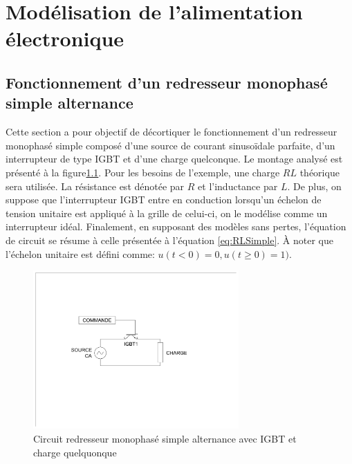 


\chapter{Modélisation de l'alimentation électronique}
\section{Fonctionnement d'un redresseur monophasé simple alternance}
Cette section a pour objectif de décortiquer le fonctionnement d'un redresseur monophasé simple composé d'une source de courant sinusoïdale parfaite, d'un interrupteur de type IGBT et d'une charge quelconque. Le montage analysé est présenté à la figure\ref{fig:RedresseurMonophaseSimpleAlternanceIGBT}. Pour les besoins de l'exemple, une charge $RL$ théorique sera utilisée. La résistance est dénotée par $R$ et l'inductance par $L$. De plus, on suppose que l'interrupteur IGBT entre en conduction lorsqu'un échelon de tension unitaire est appliqué à la grille de celui-ci, on le modélise comme un interrupteur idéal. Finalement, en supposant des modèles sans pertes, l'équation de circuit se résume à celle présentée à l'équation \ref{eq:RLSimple}. À noter que l'échelon unitaire est défini comme: $u(t<0) = 0, u(t\geq 0) = 1)$.

\begin{figure}[htb!]
	\begin{center}  
		\includegraphics[width=0.7\textwidth]{Circuit/RedresseurMonophaseSimpleAlternanceIGBT}
		\caption{Circuit redresseur monophasé simple alternance avec IGBT et charge quelquonque}
		\label{fig:RedresseurMonophaseSimpleAlternanceIGBT}
	\end{center}   
\end{figure}


